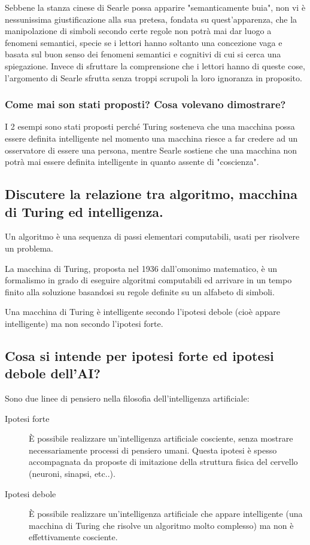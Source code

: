 \documentclass[\main/main.tex]{subfiles}
\begin{document}
Sebbene la stanza cinese di Searle possa apparire "semanticamente buia", non vi è nessunissima giustificazione alla sua pretesa, fondata su quest'apparenza, che la manipolazione di simboli secondo certe regole non potrà mai dar luogo a fenomeni semantici, specie se i lettori hanno soltanto una concezione vaga e basata sul buon senso dei fenomeni semantici e cognitivi di cui si cerca una spiegazione. Invece di sfruttare la comprensione che i lettori hanno di queste cose, l'argomento di Searle sfrutta senza troppi scrupoli la loro ignoranza in proposito.

\subsubsection{Come mai son stati proposti? Cosa volevano dimostrare?}
I 2 esempi sono stati proposti perché Turing sosteneva che una macchina possa essere definita intelligente nel momento una macchina riesce a far credere ad un osservatore di essere una persona, mentre Searle sostiene che una macchina non potrà mai essere definita intelligente in quanto assente di "coscienza".

\subsection{Discutere la relazione tra algoritmo, macchina di Turing ed intelligenza.}
Un algoritmo è una sequenza di passi elementari computabili, usati per risolvere un problema.

La macchina di Turing, proposta nel 1936 dall'omonimo matematico, è un formalismo in grado di eseguire algoritmi computabili ed arrivare in un tempo finito alla soluzione basandosi su regole definite su un alfabeto di simboli.

Una macchina di Turing è intelligente secondo l'ipotesi debole (cioè appare intelligente) ma non secondo l'ipotesi forte.

\subsection{Cosa si intende per ipotesi forte ed ipotesi debole dell'AI?}
Sono due linee di pensiero nella filosofia dell'intelligenza artificiale:
\begin{description}
  \item[Ipotesi forte] È possibile realizzare un'intelligenza artificiale cosciente, senza mostrare necessariamente processi di pensiero umani. Questa ipotesi è spesso accompagnata da proposte di imitazione della struttura fisica del cervello (neuroni, sinapsi, etc..).
  \item[Ipotesi debole] È possibile realizzare un'intelligenza artificiale che appare intelligente (una macchina di Turing che risolve un algoritmo molto complesso) ma non è effettivamente cosciente.
\end{description}
\end{document}

